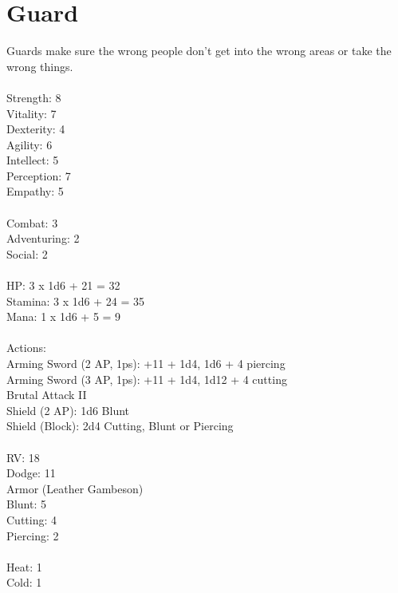 \section{Guard}

Guards make sure the wrong people don't get into the wrong areas or take the wrong things.\\
\\
Strength: 8\\
Vitality: 7\\
Dexterity: 4\\
Agility: 6\\
Intellect: 5\\
Perception: 7\\
Empathy: 5\\
\\
Combat: 3\\
Adventuring: 2\\
Social: 2\\
\\
HP: 3 x 1d6 + 21 = 32\\
Stamina: 3 x 1d6 + 24 = 35\\
Mana: 1 x 1d6 + 5 = 9\\
\\
Actions:\\
Arming Sword (2 AP, 1ps): +11 + 1d4, 1d6 + 4 piercing\\
Arming Sword (3 AP, 1ps): +11 + 1d4, 1d12 + 4 cutting\\
Brutal Attack II\\
Shield (2 AP): 1d6 Blunt\\
Shield (Block): 2d4 Cutting, Blunt or Piercing\\
\\
RV: 18\\
Dodge: 11\\
Armor (Leather Gambeson)\\
Blunt: 5\\
Cutting: 4\\
Piercing: 2\\
\\
Heat: 1\\
Cold: 1\\